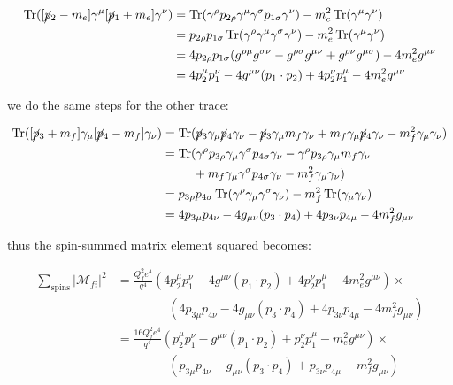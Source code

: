\documentclass[11pt]{article}
\theoremstyle{definition}
\begin{document}
\begin{align}
    \Trace([\cancel{p}_2-m_e]\gamma^{\mu}[\cancel{p}_1+m_e]\gamma^{\nu}) 
    &=
    \Trace(
        \gamma^{\rho}p_{2\rho}\gamma^{\mu}\gamma^{\sigma}p_{1\sigma}\gamma^{\nu} 
    ) - m_e^2\Trace(\gamma^{\mu}\gamma^{\nu})\\
    &=
    p_{2\rho}p_{1\sigma}\Trace(
        \gamma^{\rho}\gamma^{\mu}\gamma^{\sigma}\gamma^{\nu} 
    ) - m_e^2\Trace(\gamma^{\mu}\gamma^{\nu})\\
    &= 
    4p_{2\rho}p_{1\sigma}(
       g^{\rho\mu}g^{\sigma\nu} - g^{\rho\sigma}g^{\mu\nu} + g^{\rho\nu}g^{\mu\sigma}
    )
    - 4m_e^2g^{\mu\nu}\\
    &= 
    4p_2^{\mu}p_1^{\nu} - 4g^{\mu\nu}(p_1\cdot p_2) + 4p_2^{\nu}p_1^{\mu}
    - 4m_e^2g^{\mu\nu}\\
\end{align}

we do the same steps for the other trace:

\begin{align}
    \Trace([\cancel{p}_3+m_f]\gamma_{\mu}[\cancel{p}_4-m_f]\gamma_{\nu}) &=
    \Trace(\cancel{p}_3\gamma_{\mu}\cancel{p}_4\gamma_{\nu}
    - \cancel{p}_3\gamma_{\mu} m_f \gamma_{\nu}
    + m_f\gamma_{\mu} \cancel{p}_4 \gamma_{\nu} 
    - m_f^2\gamma_{\mu}\gamma_{\nu}
    )\\
    &=
    \Trace(
    \gamma^{\rho}p_{3\rho}\gamma_{\mu}\gamma^{\sigma}p_{4\sigma}\gamma_{\nu}
    - \gamma^{\rho}p_{3\rho}\gamma_{\mu} m_f \gamma_{\nu}\\
    &\;\;\;\;\;\;\;\;\; + m_f\gamma_{\mu} \gamma^{\sigma}p_{4\sigma} \gamma_{\nu} 
    - m_f^2\gamma_{\mu}\gamma_{\nu}
    )\\
    &=
    p_{3\rho}p_{4\sigma}\Trace(\gamma^{\rho}\gamma_{\mu}\gamma^{\sigma}\gamma_{\nu} ) - m_f^2\Trace(\gamma_{\mu}\gamma_{\nu})\\
    &=
    4p_{3\mu}p_{4\nu} - 4g_{\mu\nu}(p_3 \cdot p_4) + 4p_{3\nu}p_{4\mu} - 4m_f^2g_{\mu\nu}
\end{align}

thus the spin-summed matrix element squared becomes:

\begin{align}
    \sum_{\text{spins}} |\mathcal{M}_{fi}|^2  &= \frac{Q_f^2e^4}{q^4} 
    \left( 4p_2^{\mu}p_1^{\nu} - 4g^{\mu\nu}(p_1\cdot p_2) + 4p_2^{\nu}p_1^{\mu}
    - 4m_e^2g^{\mu\nu} \right)
    \times\\
    &\;\;\;\;\;\;\;\;\;\;\;\;\;\;\; \left( 4p_{3\mu}p_{4\nu} - 4g_{\mu\nu}(p_3 \cdot p_4) + 4p_{3\nu}p_{4\mu} - 4m_f^2g_{\mu\nu} \right)\\
    &= \frac{16Q_f^2e^4}{q^4} 
    \left( p_2^{\mu}p_1^{\nu} - g^{\mu\nu}(p_1\cdot p_2) + p_2^{\nu}p_1^{\mu}
    - m_e^2g^{\mu\nu} \right)
    \times\\
    &\;\;\;\;\;\;\;\;\;\;\;\;\;\;\; \left( p_{3\mu}p_{4\nu} - g_{\mu\nu}(p_3 \cdot p_4) + p_{3\nu}p_{4\mu} - m_f^2g_{\mu\nu} \right)\\
\end{align}
\end{document}
